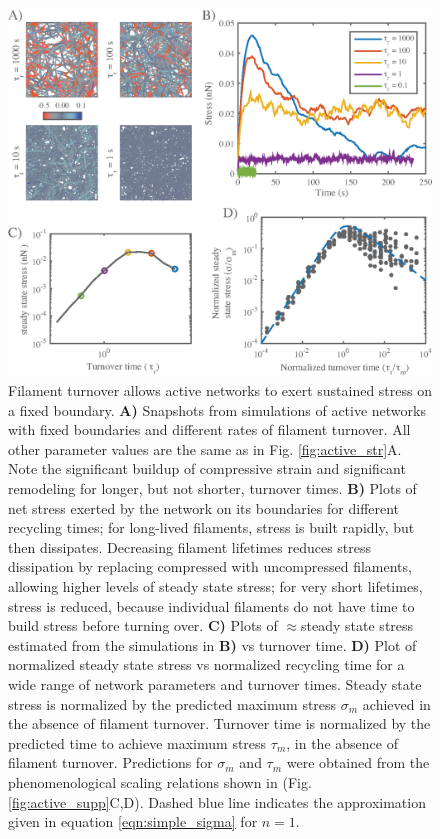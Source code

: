 \begin{figure}[H]
	\centering
	\includegraphics[width=\hsize]{active/figures/Fig7}
	\caption{\label{fig:active_rec} Filament turnover allows active networks to exert sustained stress on a fixed boundary. \textbf{A)} Snapshots from simulations of active networks with fixed boundaries and different rates of filament turnover.  All other parameter values are the same as in Fig. \ref{fig:active_str}A. Note the significant buildup of compressive strain and significant remodeling for longer, but not shorter, turnover times. \textbf{B)} Plots of net stress exerted by the network on its boundaries for different recycling times; for long-lived filaments, stress is built rapidly, but then dissipates. Decreasing filament lifetimes reduces stress dissipation by replacing compressed with uncompressed filaments, allowing higher levels of steady state stress; for very short lifetimes, stress is reduced, because individual filaments do not have time to build stress before turning over. \textbf{C)} Plots of $\approx$steady state stress estimated from the simulations in \textbf{B)} vs turnover time.  \textbf{D)} Plot of normalized steady state stress vs normalized recycling time for a wide range of network parameters and turnover times.  Steady state stress is normalized by the predicted maximum stress $\sigma_{m}$ achieved in the absence of filament turnover.  Turnover time is normalized by the predicted time to achieve maximum stress $\tau_{m}$, in the absence of filament turnover.  Predictions for $\sigma_{m}$ and $\tau_{m}$  were obtained from the phenomenological scaling relations shown in (Fig. \ref{fig:active_supp}C,D). Dashed blue line indicates the approximation given in equation \ref{eqn:simple_sigma} for $n=1$.}
\end{figure}

